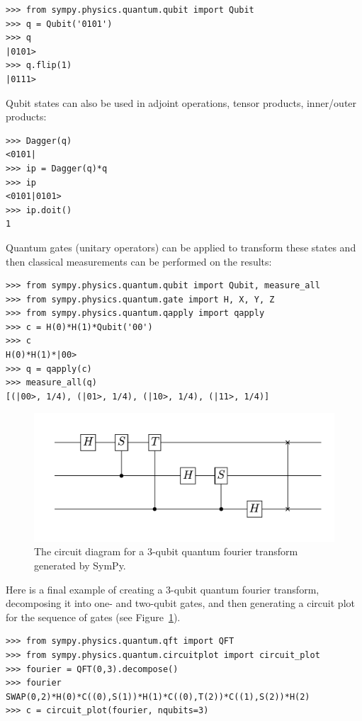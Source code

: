 \begin{verbatim}
>>> from sympy.physics.quantum.qubit import Qubit
>>> q = Qubit('0101')
>>> q
|0101>
>>> q.flip(1)
|0111>
\end{verbatim}
Qubit states can also be used in adjoint operations, tensor products, inner/outer products:
\begin{verbatim}
>>> Dagger(q)
<0101|
>>> ip = Dagger(q)*q
>>> ip
<0101|0101>
>>> ip.doit()
1
\end{verbatim}
Quantum gates (unitary operators) can be applied to transform these states and then classical measurements can be performed on the results:
\begin{verbatim}
>>> from sympy.physics.quantum.qubit import Qubit, measure_all
>>> from sympy.physics.quantum.gate import H, X, Y, Z
>>> from sympy.physics.quantum.qapply import qapply
>>> c = H(0)*H(1)*Qubit('00')
>>> c
H(0)*H(1)*|00>
>>> q = qapply(c)
>>> measure_all(q)
[(|00>, 1/4), (|01>, 1/4), (|10>, 1/4), (|11>, 1/4)]
\end{verbatim}
\begin{figure}[htbp]
\begin{center}
\includegraphics[scale=0.65]{images/circuitplot-qft}
\caption{The circuit diagram for a 3-qubit quantum fourier transform
generated by SymPy.}
\label{fig-circuitplot-qft}
\end{center}
\end{figure}
Here is a final example of creating a 3-qubit quantum fourier transform, decomposing it into one- and two-qubit gates, and then generating a circuit plot for the sequence of gates (see Figure~\ref{fig-circuitplot-qft}).
\begin{verbatim}
>>> from sympy.physics.quantum.qft import QFT
>>> from sympy.physics.quantum.circuitplot import circuit_plot
>>> fourier = QFT(0,3).decompose()
>>> fourier
SWAP(0,2)*H(0)*C((0),S(1))*H(1)*C((0),T(2))*C((1),S(2))*H(2)
>>> c = circuit_plot(fourier, nqubits=3)
\end{verbatim}
